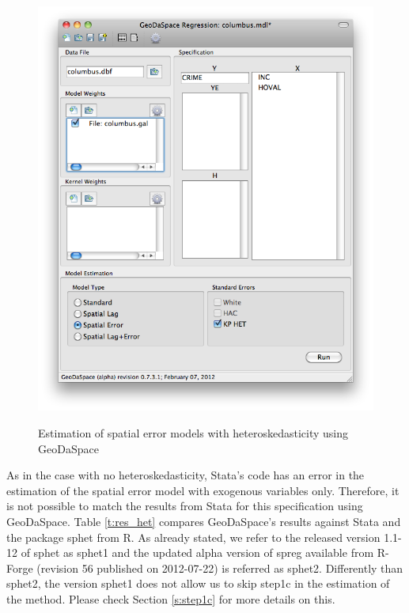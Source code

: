\documentclass{article}
\begin{document}
\begin{figure}[htb]
\caption{Estimation of spatial error models with heteroskedasticity using GeoDaSpace}
\label{f:GS_het}
\begin{center}
\includegraphics[width=0.7\linewidth]{GS_het.png}\\
\end{center}
\end{figure}

As in the case with no heteroskedasticity, Stata's code has an error in the estimation of the spatial error model with exogenous variables only. Therefore, it is not possible to match the results from Stata for this specification using GeoDaSpace. Table \ref{t:res_het} compares GeoDaSpace's results against Stata and the package sphet from R. As already stated, we refer to the released version 1.1-12 of sphet as sphet1 and the updated alpha version of spreg available from R-Forge (revision 56 published on 2012-07-22) is referred as sphet2. Differently than sphet2, the version sphet1 does not allow us to skip step1c in the estimation of the method. Please check Section \ref{s:step1c} for more details on this.
\end{document}
